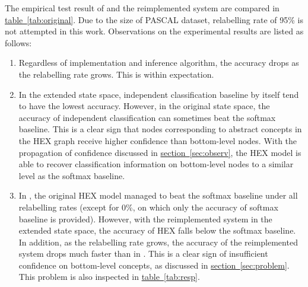 \documentclass[11pt,a4paper]{article}
\begin{document}
The empirical test result of \cite{deng2014large} and the reimplemented system are compared in \hyperref[tab:original]{table~\ref{tab:original}}. Due to the size of PASCAL dataset, relabelling rate of 95\% is not attempted in this work. Observations on the experimental results are listed as follows:
\begin{enumerate}
\item Regardless of implementation and inference algorithm, the accuracy drops as the relabelling rate grows. This is within expectation.
\item In the extended state space, independent classification baseline by itself tend to have the lowest accuracy. However, in the original state space, the accuracy of independent classification can sometimes beat the softmax baseline. This is a clear sign that nodes corresponding to abstract concepts in the HEX graph receive higher confidence than bottom-level nodes. With the propagation of confidence discussed in \hyperref[sec:observ]{section~\ref{sec:observ}}, the HEX model is able to recover classification information on bottom-level nodes to a similar level as the softmax baseline.
\item In \cite{deng2014large}, the original HEX model managed to beat the softmax baseline under all relabelling rates (except for 0\%, on which only the accuracy of softmax baseline is provided). However, with the reimplemented system in the extended state space, the accuracy of HEX falls below the softmax baseline. In addition, as the relabelling rate grows, the accuracy of the reimplemented system drops much faster than in \cite{deng2014large}. This is a clear sign of insufficient confidence on bottom-level concepts, as discussed in \hyperref[sec:problem]{section~\ref{sec:problem}}. This problem is also inspected in \hyperref[tab:resp]{table~\ref{tab:resp}}.
\end{enumerate}
\end{document}
